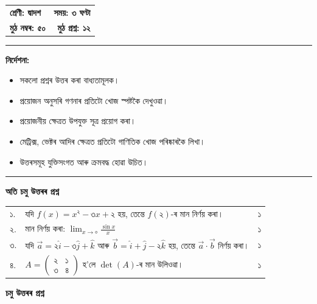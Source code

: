 \documentclass[12pt,a4paper]{article} %
\begin{document}
	\noindent
	\begin{tabularx}{\textwidth}{@{}Xr@{}}
		\textbf{শ্ৰেণী: দ্বাদশ} &
		\textbf{সময়: ৩ ঘণ্টা} \\[2pt]
		\textbf{মুঠ নম্বৰ: ৫০} &
		\textbf{মুঠ প্ৰশ্ন: ১২}
	\end{tabularx}
	
	\par\noindent\rule{\textwidth}{0.5pt}
	{\small
		\noindent
		\textbf{নিৰ্দেশনা:}
		\begin{itemize}[noitemsep]
			\item সকলো প্ৰশ্নৰ উত্তৰ কৰা বাধ্যতামূলক।
			\item প্ৰয়োজন অনুসৰি গণনাৰ প্ৰতিটো খোজ স্পষ্টকৈ দেখুওৱা।
			\item প্ৰয়োজনীয় ক্ষেত্ৰত উপযুক্ত সূত্ৰ প্ৰয়োগ কৰা।
			\item মেট্ৰিক্স, ভেক্টৰ আদিৰ ক্ষেত্ৰত প্ৰতিটো গাণিতিক খোজ পৰিষ্কাৰকৈ লিখা।
			\item উত্তৰসমূহ যুক্তিসংগত আৰু ক্ৰমবদ্ধ হোৱা উচিত।
	\end{itemize}}
	\par\noindent\rule{\textwidth}{0.5pt}
	
	\noindent
	{\large\bfseries অতি চমু উত্তৰৰ প্ৰশ্ন}\\
	
	\noindent
	\begin{tabularx}{\textwidth}{@{}lXr@{}}
		১. & যদি $f(x)=x^২-৩x+২$ হয়, তেন্তে $f(২)$-ৰ মান নিৰ্ণয় কৰা। & ১ \\[8pt]
		২. & মান নিৰ্ণয় কৰা: $\displaystyle \lim_{x\to ০}\frac{\sin x}{x}$ & ১ \\[8pt]
		৩. & যদি $\vec{a}=২\hat{i}-৩\hat{j}+\hat{k}$ আৰু $\vec{b}=\hat{i}+\hat{j}-২\hat{k}$ হয়, তেন্তে $\vec{a}\cdot\vec{b}$ নিৰ্ণয় কৰা। & ১ \\
		৪. & $A=
		\begin{pmatrix}
			২ & ১\\
			৩ & ৪
		\end{pmatrix}$
		হ'লে $\det(A)$-ৰ মান উলিওৱা। & ১
	\end{tabularx}
	
	\vspace{0.5cm}
	\noindent
	{\large\bfseries চমু উত্তৰৰ প্ৰশ্ন}\\
\end{document}
